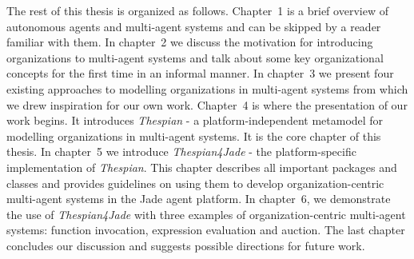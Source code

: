 The rest of this thesis is organized as follows.
Chapter~1 is a brief overview of autonomous agents and multi-agent systems and can be skipped by a reader familiar with them.
In chapter~2 we discuss the motivation for introducing organizations to multi-agent systems and talk about some key organizational concepts for the first time in an informal manner.
In chapter~3 we present four existing approaches to modelling organizations in multi-agent systems from which we drew inspiration for our own work.
Chapter~4 is where the presentation of our work begins. It introduces \textit{Thespian} - a platform-independent metamodel for modelling organizations in multi-agent systems. It is the core chapter of this thesis.
In chapter~5 we introduce \textit{Thespian4Jade} - the platform-specific implementation of \textit{Thespian}. This chapter describes all important packages and classes and provides guidelines on using them to develop organization-centric multi-agent systems in the Jade agent platform.
In chapter~6, we demonstrate the use of \textit{Thespian4Jade} with three examples of organization-centric multi-agent systems: function invocation, expression evaluation and auction.
The last chapter concludes our discussion and suggests possible directions for future work.
